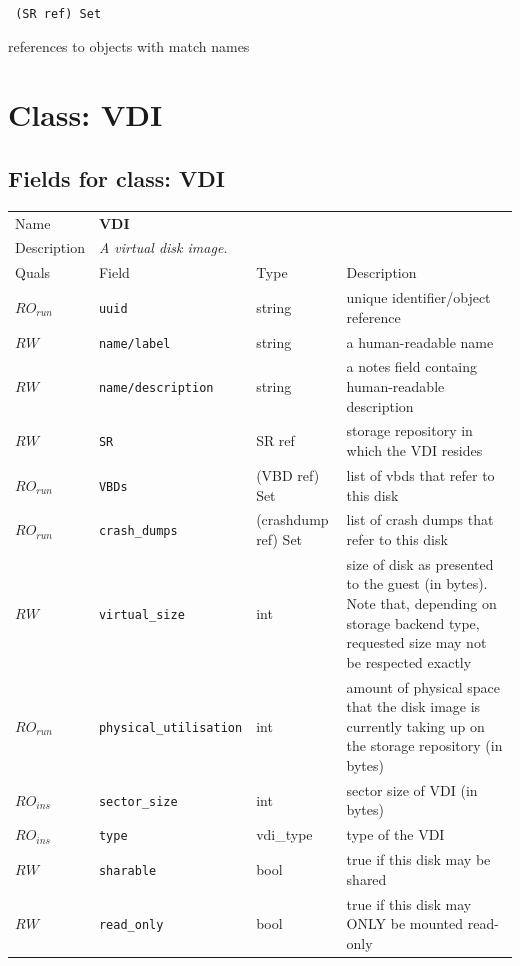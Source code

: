 \vspace{0.3cm}

{\tt 
(SR ref) Set
}


references to objects with match names
\vspace{0.3cm}
\vspace{0.3cm}
\vspace{0.3cm}

\vspace{1cm}
\newpage
\section{Class: VDI}
\subsection{Fields for class: VDI}
\begin{longtable}{|lllp{}|}
\hline
\multicolumn{1}{|l}{Name} & \multicolumn{3}{l|}{\bf VDI} \\
\multicolumn{1}{|l}{Description} & \multicolumn{3}{l|}{\parbox{11cm}{\em A
virtual disk image.}} \\
\hline
Quals & Field & Type & Description \\
\hline
$\mathit{RO}_\mathit{run}$ &  {\tt uuid} & string & unique identifier/object reference \\
$\mathit{RW}$ &  {\tt name/label} & string & a human-readable name \\
$\mathit{RW}$ &  {\tt name/description} & string & a notes field containg human-readable description \\
$\mathit{RW}$ &  {\tt SR} & SR ref & storage repository in which the VDI resides \\
$\mathit{RO}_\mathit{run}$ &  {\tt VBDs} & (VBD ref) Set & list of vbds that refer to this disk \\
$\mathit{RO}_\mathit{run}$ &  {\tt crash\_dumps} & (crashdump ref) Set & list of crash dumps that refer to this disk \\
$\mathit{RW}$ &  {\tt virtual\_size} & int & size of disk as presented to the guest (in bytes). Note that, depending on storage backend type, requested size may not be respected exactly \\
$\mathit{RO}_\mathit{run}$ &  {\tt physical\_utilisation} & int & amount of physical space that the disk image is currently taking up on the storage repository (in bytes) \\
$\mathit{RO}_\mathit{ins}$ &  {\tt sector\_size} & int & sector size of VDI (in bytes) \\
$\mathit{RO}_\mathit{ins}$ &  {\tt type} & vdi\_type & type of the VDI \\
$\mathit{RW}$ &  {\tt sharable} & bool & true if this disk may be shared \\
$\mathit{RW}$ &  {\tt read\_only} & bool & true if this disk may ONLY be mounted read-only \\
\hline
\end{longtable}
